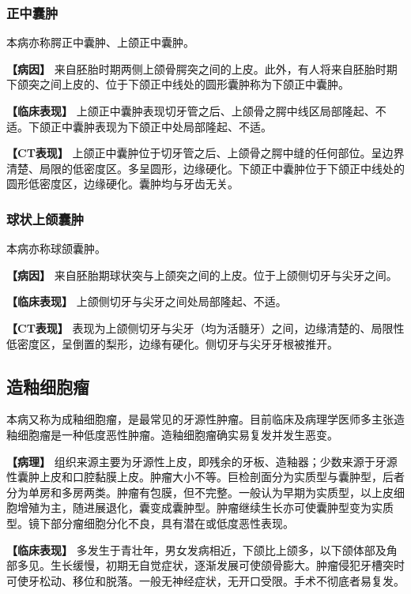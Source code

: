 \subsubsection{正中囊肿}

本病亦称腭正中囊肿、上颌正中囊肿。

\textbf{【病因】}
来自胚胎时期两侧上颌骨腭突之间的上皮。此外，有人将来自胚胎时期下颌突之间上皮的、位于下颌正中线处的圆形囊肿称为下颌正中囊肿。

\textbf{【临床表现】}
上颌正中囊肿表现切牙管之后、上颌骨之腭中线区局部隆起、不适。下颌正中囊肿表现为下颌正中处局部隆起、不适。

\textbf{【CT表现】}
上颌正中囊肿位于切牙管之后、上颌骨之腭中缝的任何部位。呈边界清楚、局限的低密度区。多呈圆形，边缘硬化。下颌正中囊肿位于下颌正中线处的圆形低密度区，边缘硬化。囊肿均与牙齿无关。

\subsubsection{球状上颌囊肿}

本病亦称球颌囊肿。

\textbf{【病因】}
来自胚胎期球状突与上颌突之间的上皮。位于上颌侧切牙与尖牙之间。

\textbf{【临床表现】} 上颌侧切牙与尖牙之间处局部隆起、不适。

\textbf{【CT表现】}
表现为上颌侧切牙与尖牙（均为活髓牙）之间，边缘清楚的、局限性低密度区，呈倒置的梨形，边缘有硬化。侧切牙与尖牙牙根被推开。

\subsection{造釉细胞瘤}

本病又称为成釉细胞瘤，是最常见的牙源性肿瘤。目前临床及病理学医师多主张造釉细胞瘤是一种低度恶性肿瘤。造釉细胞瘤确实易复发并发生恶变。

\textbf{【病理】}
组织来源主要为牙源性上皮，即残余的牙板、造釉器；少数来源于牙源性囊肿上皮和口腔黏膜上皮。肿瘤大小不等。巨检剖面分为实质型与囊肿型，后者分为单房和多房两类。肿瘤有包膜，但不完整。一般认为早期为实质型，以上皮细胞增殖为主，随进展退化，囊变成囊肿型。肿瘤继续生长亦可使囊肿型变为实质型。镜下部分瘤细胞分化不良，具有潜在或低度恶性表现。

\textbf{【临床表现】}
多发生于青壮年，男女发病相近，下颌比上颌多，以下颌体部及角部多见。生长缓慢，初期无自觉症状，逐渐发展可使颌骨膨大。肿瘤侵犯牙槽突时可使牙松动、移位和脱落。一般无神经症状，无开口受限。手术不彻底者易复发。

